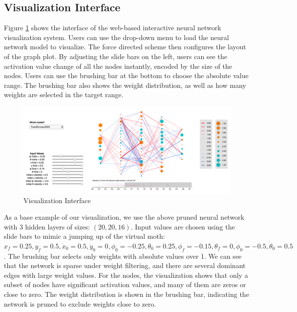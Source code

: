\documentclass[sigchi]{acmart}
\begin{document}
\subsection{Visualization Interface}
Figure \ref{inter} shows the interface of the web-based interactive neural network visualization system. Users can use the drop-down menu to load the neural network model to visualize. The force directed scheme then configures the layout of the graph plot. By adjusting the slide bars on the left, users can see the activation value change of all the nodes instantly, encoded by the size of the nodes. Users can use the brushing bar at the bottom to choose the absolute value range. The brushing bar also shows the weight distribution, as well as how many weights are selected in the target range.

\begin{figure}[h]
  \centering
  \includegraphics[width=\linewidth]{interface.pdf}
  \caption{Visualization Interface}
  \label{inter}
\end{figure}

As a base example of our visualization, we use the above pruned neural network with $3$ hidden layers of sizes: $(20, 20, 16)$. Input values are chosen using the slide bars to mimic a jumping up of the virtual moth: $x_f = 0.25, y_f = 0.5, \dot{x}_0 = 0.5, \dot{y}_0 = 0, \phi_0=-0.25, \theta_0=0.25, \phi_f=-0.15, \theta_f=0, \dot{\phi}_0 = -0.5, \dot{\theta}_0 = 0.5$. The brushing bar selects only weights with absolute values over 1. We can see that the network is sparse under weight filtering, and there are several dominant edges with large weight values. For the nodes, the visualization shows that only a subset of nodes have significant activation values, and many of them are zeros or close to zero. The weight distribution is shown in the brushing bar, indicating the network is pruned to exclude weights close to zero. 
\end{document}
